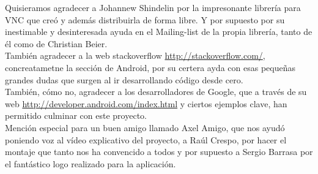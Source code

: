 Quisieramos agradecer a Johannew Shindelin por la impresonante librer\'ia para VNC que cre\'o y adem\'as distribuirla de forma libre. Y por supuesto por su inestimable y desinteresada ayuda en el Mailing-list de la propia librer\'ia, tanto de \'el como de Christian Beier.\\

Tambi\'en agradecer a la web stackoverflow \url{http://stackoverflow.com/}, concreatametne la secci\'on de Android, por su certera ayda con esas pequeñas grandes dudas que surgen al ir desarrollando c\'odigo desde cero.\\

Tambi\'en, c\'omo no, agradecer a los desarrolladores de Google, que a trav\'es de su web \url{http://developer.android.com/index.html} y ciertos ejemplos clave, han permitido culminar con este proyecto.\\

Menci\'on especial para un buen amigo llamado Axel Amigo, que nos ayud\'o poniendo voz al v\'ideo explicativo del proyecto, a Ra\'ul Crespo, por hacer el montaje que tanto nos ha convencido a todos y por supuesto a Sergio Barrasa por el fant\'astico logo realizado para la aplicaci\'on.\\
